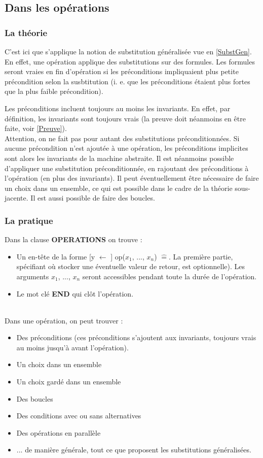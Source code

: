 \documentclass[10pt,a4paper]{article}
\newcommand{\Bequal}{\mathrel{\widehat{=}}}
\begin{document}
\subsection{Dans les opérations}

\subsubsection{La théorie}

C'est ici que s'applique la notion de substitution généralisée vue en \cref{SubstGen}. En effet, une opération applique des substitutions sur des formules. Les formules seront vraies en fin d'opération si les préconditions impliquaient plus petite précondition selon la susbtitution (i. e. que les préconditions étaient plus fortes que la plus faible précondition).

Les préconditions incluent toujours au moins les invariants. En effet, par définition, les invariants sont toujours vrais (la preuve doit néanmoins en être faite, voir \cref{Preuve}).~\\

Attention, on ne fait pas pour autant des substitutions préconditionnées. Si aucune précondition n'est ajoutée à une opération, les préconditions implicites sont alors les invariants de la machine abstraite. Il est néanmoins possible d'appliquer une substitution préconditionnée, en rajoutant des préconditions à l'opération (en plus des invariants). Il peut éventuellement être nécessaire de faire un choix dans un ensemble, ce qui est possible dans le cadre de la théorie sous-jacente. Il est aussi possible de faire des boucles.

\subsubsection{La pratique}

Dans la clause \textbf{OPERATIONS} on trouve :
\begin{itemize}
\item Un en-tête de la forme [y $\leftarrow$ ] op($x_{1}$, ..., $x_{n}$) $\Bequal$. La première partie, spécifiant où stocker une éventuelle valeur de retour, est optionnelle). Les arguments $x_{1}$, ..., $x_{n}$ seront accessibles pendant toute la durée de l'opération.
\item Le mot clé \textbf{END} qui clôt l'opération.
\end{itemize}
~\\
Dans une opération, on peut trouver :
\begin{itemize}
\item Des préconditions
(ces préconditions s'ajoutent aux invariants, toujours vrais au moins jusqu'à avant l'opération).
\item Un choix dans un ensemble
\item Un choix gardé dans un ensemble
\item Des boucles
\item Des conditions avec ou sans alternatives
\item Des opérations en parallèle
\item ... de manière générale, tout ce que proposent les substitutions généralisées.
\end{itemize}
\end{document}

